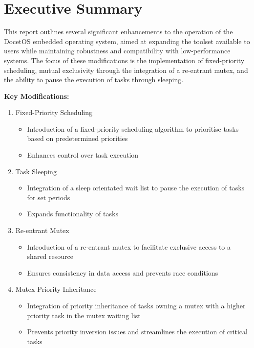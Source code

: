 \section{Executive Summary}
This report outlines several significant enhancements to the operation of the DocetOS embedded operating system, aimed at expanding the toolset available to users while maintaining robustness and compatibility with low-performance systems. The focus of these modifications is the implementation of fixed-priority scheduling, mutual exclusivity through the integration of a re-entrant mutex, and the ability to pause the execution of tasks through sleeping.\hfill\break

\noindent\textbf{Key Modifications:}
\begin{enumerate}
	\item Fixed-Priority Scheduling
	\begin{itemize}
		\item Introduction of a fixed-priority scheduling algorithm to prioritise tasks based on predetermined priorities
		\item Enhances control over task execution
	\end{itemize}
	
	\item Task Sleeping
	\begin{itemize}
		\item Integration of a sleep orientated wait list to pause the execution of tasks for set periods
		\item Expands functionality of tasks
	\end{itemize}
	
	\item Re-entrant Mutex
	\begin{itemize}
		\item Introduction of a re-entrant mutex to facilitate exclusive access to a shared resource
		\item Ensures consistency in data access and prevents race conditions
	\end{itemize}
	
	\item Mutex Priority Inheritance
	\begin{itemize}
		\item Integration of priority inheritance of tasks owning a mutex with a higher priority task in the mutex waiting list
		\item Prevents priority inversion issues and streamlines the execution of critical tasks
	\end{itemize}
	

\end{enumerate}
